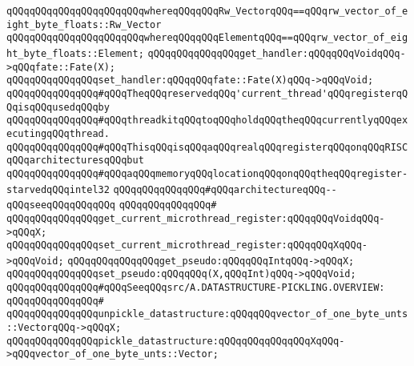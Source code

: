 \verb|qQQqqQQqqQQqqQQqqQQqqQQqwhereqQQqqQQqRw_VectorqQQq==qQQqrw_vector_of_eight_byte_floats::Rw_Vector|\newline
\verb|qQQqqQQqqQQqqQQqqQQqqQQqwhereqQQqqQQqElementqQQq==qQQqrw_vector_of_eight_byte_floats::Element;|\newline
\newline
\verb|qQQqqQQqqQQqqQQqget_handler:qQQqqQQqVoidqQQq->qQQqfate::Fate(X);|\newline
\verb|qQQqqQQqqQQqqQQqset_handler:qQQqqQQqfate::Fate(X)qQQq->qQQqVoid;|\newline
\newline
\verb|qQQqqQQqqQQqqQQq#qQQqTheqQQqreservedqQQq'current_thread'qQQqregisterqQQqisqQQqusedqQQqby|\newline
\verb|qQQqqQQqqQQqqQQq#qQQqthreadkitqQQqtoqQQqholdqQQqtheqQQqcurrentlyqQQqexecutingqQQqthread.|\newline
\verb|qQQqqQQqqQQqqQQq#qQQqThisqQQqisqQQqaqQQqrealqQQqregisterqQQqonqQQqRISCqQQqarchitecturesqQQqbut|\newline
\verb|qQQqqQQqqQQqqQQq#qQQqaqQQqmemoryqQQqlocationqQQqonqQQqtheqQQqregister-starvedqQQqintel32|\newline
\verb|qQQqqQQqqQQqqQQq#qQQqarchitectureqQQq--qQQqseeqQQqqQQqqQQq|\newline
\verb|qQQqqQQqqQQqqQQq#|\newline
\verb|qQQqqQQqqQQqqQQqget_current_microthread_register:qQQqqQQqVoidqQQq->qQQqX;|\newline
\verb|qQQqqQQqqQQqqQQqset_current_microthread_register:qQQqqQQqXqQQq->qQQqVoid;|\newline
\newline
\verb|qQQqqQQqqQQqqQQqget_pseudo:qQQqqQQqIntqQQq->qQQqX;|\newline
\verb|qQQqqQQqqQQqqQQqset_pseudo:qQQqqQQq(X,qQQqInt)qQQq->qQQqVoid;|\newline
\newline
\verb|qQQqqQQqqQQqqQQq#qQQqSeeqQQqsrc/A.DATASTRUCTURE-PICKLING.OVERVIEW:|\newline
\verb|qQQqqQQqqQQqqQQq#|\newline
\verb|qQQqqQQqqQQqqQQqunpickle_datastructure:qQQqqQQqvector_of_one_byte_unts::VectorqQQq->qQQqX;|\newline
\verb|qQQqqQQqqQQqqQQqpickle_datastructure:qQQqqQQqqQQqqQQqXqQQq->qQQqvector_of_one_byte_unts::Vector;|\newline
